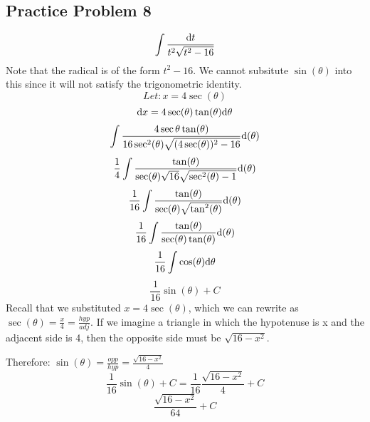 \documentclass{math}
\begin{document}
\subsection*{Practice Problem 8}
\[ \int{\frac{\mathrm{d}{t}}{t^{2}\sqrt{t^{2}-16}}} \]
Note that the radical is of the form \( t^{2}-16 \). We cannot subsitute
\( \sin(\theta) \) into this since it will not satisfy the trigonometric
identity.
\[ Let: x = 4\sec(\theta) \]
\[ \mathrm{d}{x} = 4\sec(\theta)\tan(\theta)\mathrm{d}{\theta} \]
\[ \int{\frac{4\sec{\theta}\tan(\theta)}
   {16\sec^{2}(\theta)\sqrt{(4\sec(\theta))^{2}-16}}\mathrm{d}(\theta)} \]
\[ \frac{1}{4}\int{\frac{\tan(\theta)}
   {\sec(\theta)\sqrt{16}\sqrt{\sec^{2}(\theta)-1}}\mathrm{d}(\theta)} \]
\[ \frac{1}{16}\int{\frac{\tan(\theta)}
   {\sec(\theta)\sqrt{\tan^{2}(\theta)}}\mathrm{d}(\theta)} \]
\[ \frac{1}{16}\int{\frac{\tan(\theta)}
   {\sec(\theta)\tan(\theta)}\mathrm{d}(\theta)} \]
\[ \frac{1}{16}\int{\cos(\theta)\mathrm{d}{\theta}} \]
\[ \frac{1}{16}\sin(\theta)+C \]
Recall that we substituted \( x = 4\sec(\theta) \), which we can rewrite as
\( \sec(\theta) = \frac{x}{4} = \frac{hyp}{adj} \). If we imagine a triangle in
which the hypotenuse is x and the adjacent side is 4, then the opposite side
must be \( \sqrt{16-x^{2}} \).
\begin{center}
\end{center}
Therefore: \( \sin(\theta) = \frac{opp}{hyp} = \frac{\sqrt{16-x^{2}}}{4} \)
\[ \frac{1}{16}\sin(\theta)+C = \frac{1}{16}\frac{\sqrt{16-x^{2}}}{4}+C \]
\[ \frac{\sqrt{16-x^{2}}}{64}+C \]
\end{document}
